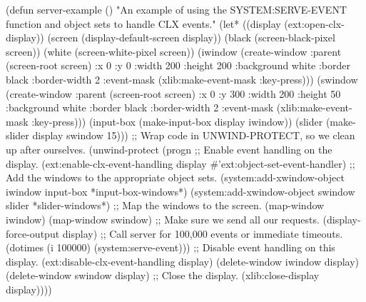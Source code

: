 \begin{lisp}
(defun server-example ()
  "An example of using the SYSTEM:SERVE-EVENT function and object sets to
   handle CLX events."
  (let* ((display (ext:open-clx-display))
         (screen (display-default-screen display))
         (black (screen-black-pixel screen))
         (white (screen-white-pixel screen))
         (iwindow (create-window :parent (screen-root screen)
                                 :x 0 :y 0 :width 200 :height 200
                                 :background white :border black
                                 :border-width 2
                                 :event-mask
                                 (xlib:make-event-mask :key-press)))
         (swindow (create-window :parent (screen-root screen)
                                 :x 0 :y 300 :width 200 :height 50
                                 :background white :border black
                                 :border-width 2
                                 :event-mask
                                 (xlib:make-event-mask :key-press)))
         (input-box (make-input-box display iwindow))
         (slider (make-slider display swindow 15)))
    ;; Wrap code in UNWIND-PROTECT, so we clean up after ourselves.
    (unwind-protect
        (progn
          ;; Enable event handling on the display.
          (ext:enable-clx-event-handling display
                                         #'ext:object-set-event-handler)
          ;; Add the windows to the appropriate object sets.
          (system:add-xwindow-object iwindow input-box
                                       *input-box-windows*)
          (system:add-xwindow-object swindow slider
                                       *slider-windows*)
          ;; Map the windows to the screen.
          (map-window iwindow)
          (map-window swindow)
          ;; Make sure we send all our requests.
          (display-force-output display)
          ;; Call server for 100,000 events or immediate timeouts.
          (dotimes (i 100000) (system:serve-event)))
      ;; Disable event handling on this display.
      (ext:disable-clx-event-handling display)
      (delete-window iwindow display)
      (delete-window swindow display)
      ;; Close the display.
      (xlib:close-display display))))
\end{lisp}

